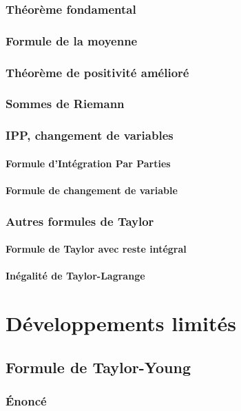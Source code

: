 \documentclass[12pt,a4paper,french]{book}
\begin{document}
		\subsection{Théorème fondamental}
		\subsection{Formule de la moyenne}
		\subsection{Théorème de positivité amélioré}
		\subsection{Sommes de Riemann}
		\subsection{IPP, changement de variables}
			\subsubsection{Formule d'Intégration Par Parties}
			\subsubsection{Formule de changement de variable}
		\subsection{Autres formules de Taylor}
			\subsubsection{Formule de Taylor avec reste intégral}
			\subsubsection{Inégalité de Taylor-Lagrange}

\chapter{Développements limités}
	\section{Formule de Taylor-Young}
		\subsection{Énoncé}
		
\end{document}
